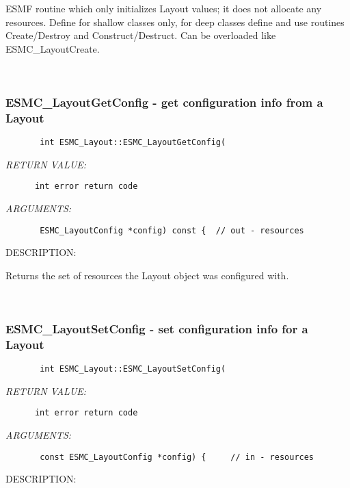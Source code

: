         ESMF routine which only initializes Layout values; it does not
        allocate any resources.  Define for shallow classes only,
        for deep classes define and use routines Create/Destroy and
        Construct/Destruct.  Can be overloaded like ESMC\_LayoutCreate.
   
 
\mbox{}\hrulefill\ 
 
\subsubsection{ESMC\_LayoutGetConfig - get configuration info from a Layout}


  
\begin{verbatim}       int ESMC_Layout::ESMC_LayoutGetConfig(\end{verbatim}{\em RETURN VALUE:}
\begin{verbatim}      int error return code\end{verbatim}{\em ARGUMENTS:}
\begin{verbatim}       ESMC_LayoutConfig *config) const {  // out - resources\end{verbatim}
{\sf DESCRIPTION:\\ }


      Returns the set of resources the Layout object was configured with.
   
 
\mbox{}\hrulefill\ 
 
\subsubsection{ESMC\_LayoutSetConfig - set configuration info for a Layout}


  
\begin{verbatim}       int ESMC_Layout::ESMC_LayoutSetConfig(\end{verbatim}{\em RETURN VALUE:}
\begin{verbatim}      int error return code\end{verbatim}{\em ARGUMENTS:}
\begin{verbatim}       const ESMC_LayoutConfig *config) {     // in - resources\end{verbatim}
{\sf DESCRIPTION:\\ }


